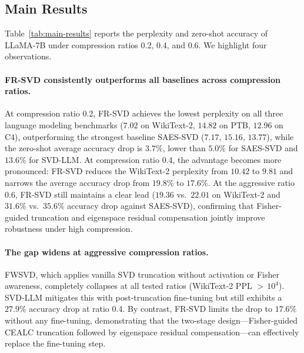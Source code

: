 \documentclass[a4paper,fleqn]{cas-dc}
\begin{document}
\subsection{Main Results}\label{sec:main-results-llama7b}

Table~\ref{tab:main-results} reports the perplexity and zero-shot accuracy of LLaMA-7B under compression ratios 0.2, 0.4, and 0.6. We highlight four observations.



\paragraph{FR-SVD consistently outperforms all baselines across compression ratios.}
At compression ratio 0.2, FR-SVD achieves the lowest perplexity on all three language modeling benchmarks ($7.02$ on WikiText-2, $14.82$ on PTB, $12.96$ on C4), outperforming the strongest baseline SAES-SVD ($7.17$, $15.16$, $13.77$), while the zero-shot average accuracy drop is $3.7\%$, lower than $5.0\%$ for SAES-SVD and $13.6\%$ for SVD-LLM. At compression ratio 0.4, the advantage becomes more pronounced: FR-SVD reduces the WikiText-2 perplexity from $10.42$ to $9.81$ and narrows the average accuracy drop from $19.8\%$ to $17.6\%$. At the aggressive ratio 0.6, FR-SVD still maintains a clear lead ($19.36$ vs.\ $22.01$ on WikiText-2 and $31.6\%$ vs.\ $35.6\%$ accuracy drop against SAES-SVD), confirming that Fisher-guided truncation and eigenspace residual compensation jointly improve robustness under high compression.

\paragraph{The gap widens at aggressive compression ratios.}
FWSVD, which applies vanilla SVD truncation without activation or Fisher awareness, completely collapses at all tested ratios (WikiText-2 PPL $>$\,$10^4$). SVD-LLM mitigates this with post-truncation fine-tuning but still exhibits a $27.9\%$ accuracy drop at ratio 0.4. By contrast, FR-SVD limits the drop to $17.6\%$ without any fine-tuning, demonstrating that the two-stage design---Fisher-guided CEALC truncation followed by eigenspace residual compensation---can effectively replace the fine-tuning step.
\end{document}
